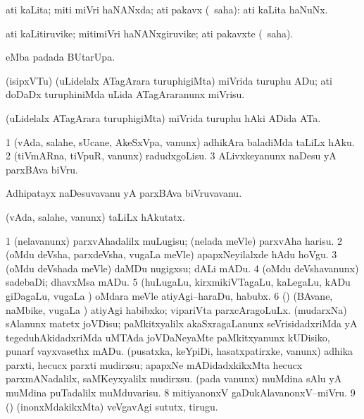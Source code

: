 \bentry
{}
\gl{\gu}
\bmng
ati kaLita; miti miVri haNANxda; ati pakavx (\rUpa\ saha):  ati kaLita haNuNx. 
\emng
\eentry


\bentry
{}
\gl{\nA}
\bmng
ati kaLitiruvike; mitimiVri haNANxgiruvike; ati pakavxte (\rUpa\ saha). 
\emng
\eentry


\bentry
{}
\gl{\kirx}
\bmng
{} eMba padada BUtarUpa. 
\emng
\eentry


\bentry
{}
\gl{\sakirx}
\bmng
(isipxVTu) (uLidelalx ATagArara turuphigiMta) miVrida turuphu ADu; ati doDaDx turuphiniMda uLida ATagAraranunx miVrisu. 
\emng
\eentry


\bentry
{}
\gl{\nA}
\bmng
(uLidelalx ATagArara turuphigiMta) miVrida turuphu hAki ADida ATa. 
\emng
\eentry


\bentry
{}
\gl{\sakirx}
\bmng
\bnum
\num{1} (vAda, salahe, sUcane, AkeSxVpa, \mo vanunx) adhikAra baladiMda taLiLx hAku. 
\num{2} (tiVmARna, tiVpuR, \mo vanunx) radudxgoLisu. 
\num{3} ALivxkeyanunx naDesu yA parxBAva biVru. 
\enum
\emng
\eentry


\bentry
{}
\gl{\nA}
\bmng
Adhipatayx naDesuvavanu yA parxBAva biVruvavanu. 
\emng
\eentry


\bentry
{}
\gl{\kirxvi}
\bmng
(vAda, salahe, \mo vanunx) taLiLx hAkutatx. 
\emng
\eentry


\bentry
{}
\gl{\sakirx}
\bmng
\bnum
\num{1} (nelavanunx) parxvAhadalilx muLugisu; (nelada meVle) parxvAha harisu. 
\num{2} (oMdu deVsha, parxdeVsha, \mo vugaLa meVle) apapxNeyilalxde hAdu hoVgu. 
\num{3} (oMdu deVshada meVle) daMDu nugigxsu; dALi mADu. 
\num{4} (oMdu deVshavanunx) sadebaDi; dhavxMsa mADu. 
\num{5} (huLugaLu, kirxmikiVTagaLu, kaLegaLu, kADu giDagaLu, \mo vugaLa \vi) oMdara meVle atiyAgi--haraDu, habubx. 
\num{6} (\rUpa) (BAvane, naMbike, \mo vugaLa \vi) atiyAgi habibxko; vipariVta parxcAragoLuLx. 
 (mudarxNa) 
\banum
{} sAlanunx matetx joVDisu; paMkitxyalilx akaSxragaLanunx seVrisidadxriMda yA tegeduhAkidadxriMda uMTAda joVDaNeyaMte paMkitxyanunx kUDisiko, punarf vayxvasethx mADu. 
 (pusatxka, keYpiDi, hasatxpatirxke, \mo vanunx) adhika parxti, hecucx parxti mudirxsu; apapxNe mADidadxkikxMta hecucx parxmANadalilx, saMKeyxyalilx mudirxsu. 
 (pada \mo vanunx) muMdina sAlu yA muMdina puTadalilx muMduvarisu. 
\eanum
\numie
\num{8} mitiyanonxV gaDukAlavanonxV--miVru. 
\num{9} (\yaMshA) (inonxMdakikxMta) veVgavAgi sututx, tirugu. 
\enum
\emng
\eentry


